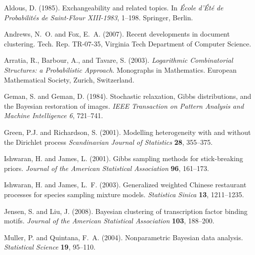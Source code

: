 \documentclass[twoside]{article}
\begin{document}
{\small 
\vspace{-0.1cm}
\begin{thebibliography}{99}

Aldous, D. (1985).
\newblock Exchangeability and related topics.
\newblock In \emph{\'{E}cole d'\'{E}t\'{e} de Probabilit\'{e}s de Saint-Flour
  XIII-1983},  1--198. Springer, Berlin.

Andrews, N.~O. and Fox, E.~A. (2007).
\newblock Recent developments in document clustering.
\newblock Tech. Rep. TR-07-35, Virginia Tech Department of Computer Science.

Arratia, R., Barbour, A., and Tavare, S. (2003).
\newblock \emph{Logarithmic Combinatorial Structures: a Probabilistic
  Approach}.
\newblock Monographs in Mathematics. European Mathematical Society, Zurich,
  Switzerland.

Geman, S. and Geman, D. (1984).
\newblock Stochastic relaxation, {G}ibbs distributions, and the {B}ayesian
  restoration of images.
\newblock \emph{IEEE Transaction on Pattern Analysis and Machine Intelligence
  6}, 721--741.

Green, P.J.  and Richardson, S. (2001). 
\newblock Modelling heterogeneity with and without the {D}irichlet process
\newblock \emph{Scandinavian Journal of Statistics} \textbf {28}, 355--375. 

Ishwaran, H. and James, L. (2001).
\newblock Gibbs sampling methods for stick-breaking priors.
\newblock \emph{Journal of the American Statistical Association} \textbf{96},
  161--173.

Ishwaran, H. and James, L.~F. (2003).
\newblock Generalized weighted {C}hinese restaurant processes for species
  sampling mixture models.
\newblock \emph{Statistica Sinica} \textbf{13}, 1211--1235.

Jensen, S. and Liu, J. (2008).
\newblock Bayesian clustering of transcription factor binding motifs.
\newblock \emph{Journal of the American Statistical Association} \textbf{103},
  188--200.

Muller, P. and Quintana, F.~A. (2004).
\newblock Nonparametric {B}ayesian data analysis.
\newblock \emph{Statistical Science} \textbf{19}, 95--110.


\end{thebibliography}}
\end{document}
